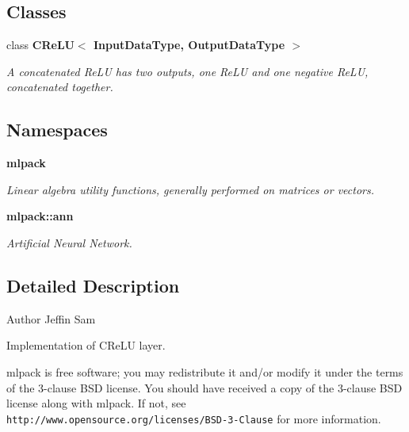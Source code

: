 \subsection*{Classes}
\begin{DoxyCompactItemize}
\item 
class \textbf{ C\+Re\+L\+U$<$ Input\+Data\+Type, Output\+Data\+Type $>$}
\begin{DoxyCompactList}\small\item\em A concatenated Re\+LU has two outputs, one Re\+LU and one negative Re\+LU, concatenated together. \end{DoxyCompactList}\end{DoxyCompactItemize}
\subsection*{Namespaces}
\begin{DoxyCompactItemize}
\item 
 \textbf{ mlpack}
\begin{DoxyCompactList}\small\item\em Linear algebra utility functions, generally performed on matrices or vectors. \end{DoxyCompactList}\item 
 \textbf{ mlpack\+::ann}
\begin{DoxyCompactList}\small\item\em Artificial Neural Network. \end{DoxyCompactList}\end{DoxyCompactItemize}


\subsection{Detailed Description}
\begin{DoxyAuthor}{Author}
Jeffin Sam
\end{DoxyAuthor}
Implementation of C\+Re\+LU layer.

mlpack is free software; you may redistribute it and/or modify it under the terms of the 3-\/clause B\+SD license. You should have received a copy of the 3-\/clause B\+SD license along with mlpack. If not, see {\tt http\+://www.\+opensource.\+org/licenses/\+B\+S\+D-\/3-\/\+Clause} for more information. 
